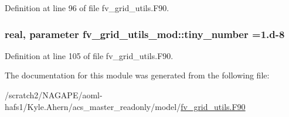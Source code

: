 Definition at line 96 of file fv\-\_\-grid\-\_\-utils.\-F90.

\subsubsection[{tiny\-\_\-number}]{\setlength{\rightskip}{0pt plus 5cm}real, parameter fv\-\_\-grid\-\_\-utils\-\_\-mod\-::tiny\-\_\-number =1.d-\/8\hspace{0.3cm}{\ttfamily [private]}}\label{classfv__grid__utils__mod_a800597e665792a2ca112d3db14ae3c4c}


Definition at line 105 of file fv\-\_\-grid\-\_\-utils.\-F90.



The documentation for this module was generated from the following file\-:\begin{DoxyCompactItemize}
\item 
/scratch2/\-N\-A\-G\-A\-P\-E/aoml-\/hafs1/\-Kyle.\-Ahern/acs\-\_\-master\-\_\-readonly/model/\hyperlink{fv__grid__utils_8F90}{fv\-\_\-grid\-\_\-utils.\-F90}\end{DoxyCompactItemize}
